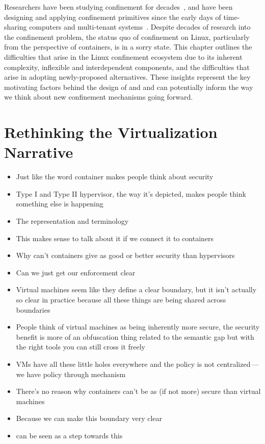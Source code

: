 \begin{inprogress}
Researchers have been studying confinement for decades~\cite{lampson1973_confinement}, and
have been designing and applying confinement primitives since the early days of
time-sharing computers and multi-tenant systems~\cite{shu2016_security_isolation_study}.
Despite decades of research into the confinement problem, the status quo of confinement on
Linux, particularly from the perspective of containers, is in a sorry state. This chapter
outlines the difficulties that arise in the Linux confinement ecosystem due to its
inherent complexity, inflexible and interdependent components, and the difficulties that
arise in adopting newly-proposed alternatives. These insights represent the key
motivating factors behind the design of \bpfbox{} and \bpfcontain{} and can potentially
inform the way we think about new confinement mechanisms going forward.
\end{inprogress}

\section{Rethinking the Virtualization Narrative}%

\begin{inprogress}
  \begin{itemize}
    \item Just like the word container makes people think about security
    \item Type I and Type II hypervisor, the way it's depicted, makes people think something else is happening
    \item The representation and terminology
    \item This makes sense to talk about it if we connect it to containers
    \item Why can't containers give as good or better security than hypervisors
    \item Can we just get our enforcement clear
    \item Virtual machines seem like they define a clear boundary, but it isn't actually
          so clear in practice because all these things are being shared across boundaries
    \item People think of virtual machines as being inherently more secure, the security
          benefit is more of an obfuscation thing related to the semantic gap but with the right
          tools you can still cross it freely
    \item VMs have all these little holes everywhere and the policy is not centralized\,---\,we
          have policy through mechanism
    \item There's no reason why containers can't be as (if not more) secure than virtual machines
    \item Because we can make this boundary very clear
    \item \bpfcontain{} can be seen as a step towards this
  \end{itemize}
\end{inprogress}

